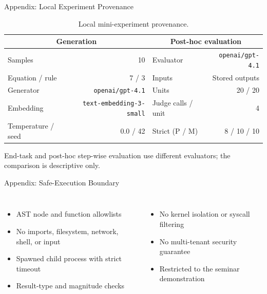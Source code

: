 \begin{frame}{Appendix: Local Experiment Provenance}
  \small
  \begin{table}
    \caption{Local mini-experiment provenance.}
    \label{tab:app-local-provenance}
    \begin{tabular}{@{}lr@{\qquad}lr@{}}
      \toprule
      \multicolumn{2}{c}{\textbf{Generation}} & \multicolumn{2}{c}{\textbf{Post-hoc evaluation}} \\
      \midrule
      Samples & 10 & Evaluator & \texttt{openai/gpt-4.1} \\
      Equation / rule & 7 / 3 & Inputs & Stored outputs \\
      Generator & \texttt{openai/gpt-4.1} & Units & 20 / 20 \\
      Embedding & \texttt{text-embedding-3-small} & Judge calls / unit & 4 \\
      Temperature / seed & 0.0 / 42 & Strict (P / M) & 8 / 10 \quad 9 / 10 \\
      \bottomrule
    \end{tabular}
  \end{table}
  \vspace{0.24cm}
  \par
  End-task and post-hoc step-wise evaluation use different evaluators; the comparison is descriptive only.
\end{frame}

\begin{frame}{Appendix: Safe-Execution Boundary}
  \begin{columns}[T,onlytextwidth]
      \par\vspace{0.10cm}
      \begin{itemize}
        \item AST node and function allowlists
        \item No imports, filesystem, network, shell, or input
        \item Spawned child process with strict timeout
        \item Result-type and magnitude checks
      \end{itemize}
      \par\vspace{0.10cm}
      \begin{itemize}
        \item No kernel isolation or syscall filtering
        \item No multi-tenant security guarantee
        \item Restricted to the seminar demonstration
      \end{itemize}
  \end{columns}
\end{frame}
